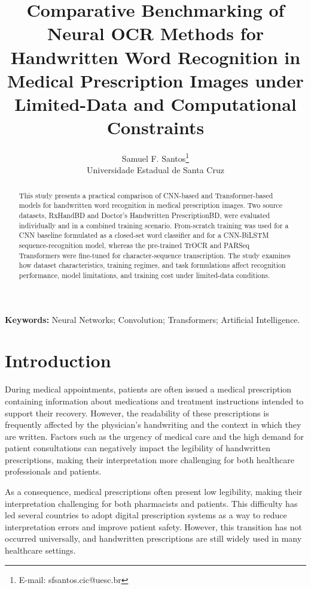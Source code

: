\documentclass[11pt,a4paper]{article}
\title{Comparative Benchmarking of Neural OCR Methods for Handwritten Word Recognition in Medical Prescription Images under Limited-Data and Computational Constraints}
\author{
  Samuel F. Santos\thanks{E-mail: sfsantos.cic@uesc.br}
  \\ Universidade Estadual de Santa Cruz
}
\date{}
\begin{document}
\maketitle

\begin{abstract}

This study presents a practical comparison of CNN-based and Transformer-based models for handwritten word recognition in medical prescription images. Two source datasets, RxHandBD and Doctor's Handwritten PrescriptionBD, were evaluated individually and in a combined training scenario. From-scratch training was used for a CNN baseline formulated as a closed-set word classifier and for a CNN-BiLSTM sequence-recognition model, whereas the pre-trained TrOCR and PARSeq Transformers were fine-tuned for character-sequence transcription. The study examines how dataset characteristics, training regimes, and task formulations affect recognition performance, model limitations, and training cost under limited-data conditions.
\end{abstract}

\noindent\textbf{Keywords:} Neural Networks; Convolution; Transformers; Artificial Intelligence.

\section{Introduction}
\label{sec:introduction}





During medical appointments, patients are often issued a medical prescription containing information about medications and treatment instructions intended to support their recovery. However, the readability of these prescriptions is frequently affected by the physician's handwriting and the context in which they are written. Factors such as the urgency of medical care and the high demand for patient consultations can negatively impact the legibility of handwritten prescriptions, making their interpretation more challenging for both healthcare professionals and patients.

As a consequence, medical prescriptions often present low legibility, making their interpretation challenging for both pharmacists and patients. This difficulty has led several countries to adopt digital prescription systems as a way to reduce interpretation errors and improve patient safety. However, this transition has not occurred universally, and handwritten prescriptions are still widely used in many healthcare settings.
\end{document}
